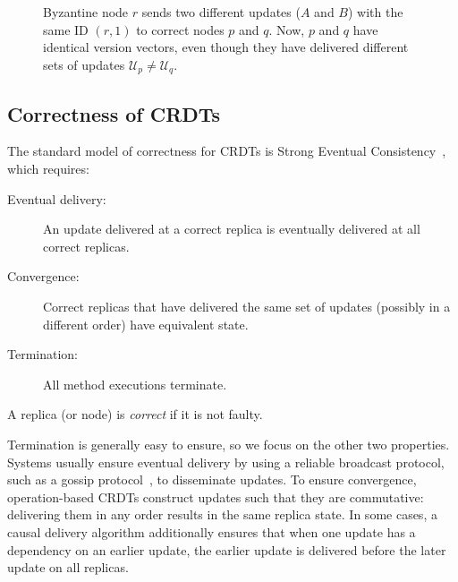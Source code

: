 \documentclass[sigplan,review]{acmart}
\begin{document}
\begin{figure*}
\centering
{}
\caption{Byzantine node $r$ sends two different updates ($A$ and $B$) with the same ID $(r,1)$ to correct nodes $p$ and $q$. Now, $p$ and $q$ have identical version vectors, even though they have delivered different sets of updates $\mathcal{U}_p \ne \mathcal{U}_q$.}
\label{fig:version-vectors}
\end{figure*}

\subsection{Correctness of CRDTs}\label{sec:sec}

The standard model of correctness for CRDTs is Strong Eventual Consistency~\cite{Shapiro:2011,Gomes:2017gy}, which requires:
\begin{description}
\item[Eventual delivery:] An update delivered at a correct replica is eventually delivered at all correct replicas.
\item[Convergence:] Correct replicas that have delivered the same set of updates (possibly in a different order) have equivalent state.
\item[Termination:] All method executions terminate.
\end{description}
A replica (or node) is \emph{correct} if it is not faulty.

Termination is generally easy to ensure, so we focus on the other two properties.
Systems usually ensure eventual delivery by using a reliable broadcast protocol, such as a gossip protocol~\cite{Leitao:2009fi}, to disseminate updates.
To ensure convergence, operation-based CRDTs construct updates such that they are commutative: delivering them in any order results in the same replica state.
In some cases, a causal delivery algorithm additionally ensures that when one update has a dependency on an earlier update, the earlier update is delivered before the later update on all replicas.
\end{document}
